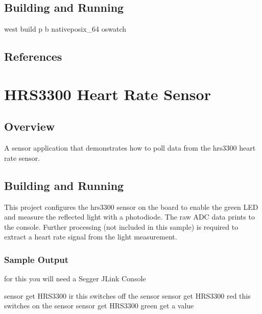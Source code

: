 \documentclass[letterpaper,10pt,english]{sphinxmanual}
\begin{document}
\subsection{Building and Running}
\label{\detokenize{samples/oswatchREADME:building-and-running}}
west build \sphinxhyphen{}p \sphinxhyphen{}b  native\sphinxhyphen{}posix\_64 oswatch


\subsection{References}
\label{\detokenize{samples/oswatchREADME:references}}

\section{HRS3300 Heart Rate Sensor}
\label{\detokenize{samples/README:hrs3300-heart-rate-sensor}}\label{\detokenize{samples/README:hrs3300}}\label{\detokenize{samples/README::doc}}

\subsection{Overview}
\label{\detokenize{samples/README:overview}}
A sensor application that demonstrates how to poll data from the hrs3300 heart
rate sensor.


\subsection{Building and Running}
\label{\detokenize{samples/README:building-and-running}}
This project configures the hrs3300 sensor on the  board to
enable the green LED and measure the reflected light with a photodiode. The raw
ADC data prints to the console. Further processing (not included in this
sample) is required to extract a heart rate signal from the light measurement.


\subsubsection{Sample Output}
\label{\detokenize{samples/README:sample-output}}
for this you will need a Segger JLink Console

\begin{sphinxVerbatim}[commandchars=\\\{\}]
 sensor get HRS3300  ir \PYGZhy{}\PYGZhy{} this switches off the sensor
 sensor get HRS3300  red \PYGZhy{}\PYGZhy{} this switches on the sensor
 sensor get HRS3300  green \PYGZhy{}\PYGZhy{} get a value
\end{sphinxVerbatim}
\end{document}
